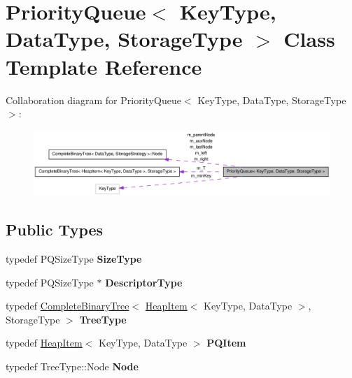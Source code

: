 \hypertarget{class_priority_queue}{
\section{PriorityQueue$<$ KeyType, DataType, StorageType $>$ Class Template Reference}
\label{class_priority_queue}
}


Collaboration diagram for PriorityQueue$<$ KeyType, DataType, StorageType $>$:\nopagebreak
\begin{figure}[H]
\begin{center}
\leavevmode
\includegraphics[width=400pt]{class_priority_queue__coll__graph}
\end{center}
\end{figure}
\subsection*{Public Types}
\begin{DoxyCompactItemize}
\item 
\hypertarget{class_priority_queue_a4fee547a199ba73a3a5930ff472d53ba}{
typedef PQSizeType {\bfseries SizeType}}
\label{class_priority_queue_a4fee547a199ba73a3a5930ff472d53ba}

\item 
\hypertarget{class_priority_queue_abe5003d7a343b66513416707ca504903}{
typedef PQSizeType $\ast$ {\bfseries DescriptorType}}
\label{class_priority_queue_abe5003d7a343b66513416707ca504903}

\item 
\hypertarget{class_priority_queue_a9e91b1dd254fd8cfb17af4536b9d37ad}{
typedef \hyperlink{class_complete_binary_tree}{CompleteBinaryTree}$<$ \hyperlink{class_heap_item}{HeapItem}$<$ KeyType, DataType $>$, StorageType $>$ {\bfseries TreeType}}
\label{class_priority_queue_a9e91b1dd254fd8cfb17af4536b9d37ad}

\item 
\hypertarget{class_priority_queue_a11bfb9c0d48c39a48fed2a442826e9a7}{
typedef \hyperlink{class_heap_item}{HeapItem}$<$ KeyType, DataType $>$ {\bfseries PQItem}}
\label{class_priority_queue_a11bfb9c0d48c39a48fed2a442826e9a7}

\item 
\hypertarget{class_priority_queue_a95d79c45d0a7d055a79b237b0313d253}{
typedef TreeType::Node {\bfseries Node}}
\label{class_priority_queue_a95d79c45d0a7d055a79b237b0313d253}

\end{DoxyCompactItemize}
